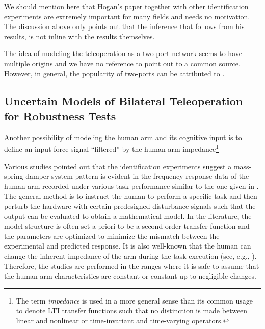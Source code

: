 We should mention here that Hogan's paper together with other identification experiments are extremely important for many
fields and needs no motivation. The discussion above only points out that the inference that follows from his results, 
is not inline with the results themselves. 

The idea of modeling the teleoperation as a two-port network seems to have multiple origins and we have no reference to 
point out to a common source. However, in general, the popularity of two-ports can be attributed to 
\cite{andersonspong,nieslotine,rajuphd,hannaford89,yokokohjiyoshikawa}. 

\subsection{Uncertain Models of Bilateral Teleoperation for Robustness Tests}\label{sec:lit:uncmodel}

Another possibility of modeling the human arm and its cognitive input is to define an input force signal ``filtered'' by the 
human arm impedance\footnote{The term \emph{impedance} is used in a more general sense than its common usage to denote
LTI transfer functions such that no distinction is made between linear and nonlinear or time-invariant and time-varying 
operators.} 

Various studies pointed out that the identification experiments suggest a mass-spring-damper system pattern is evident
in the frequency response data of the human arm recorded under various task performance similar to the one given in \cite{hogan89}.
The general method is to instruct the human to perform a specific task and then perturb the hardware with certain predesigned
disturbance signals such that the output can be evaluated to obtain a mathematical model. In the literature, the model structure
is often set a priori to be a second order transfer function and the parameters are optimized to minimize the mismatch between
the experimental and predicted response. It is also well-known that the human can change the inherent impedance of the arm during
the task execution (see, e.g., \cite{tsujimorasso}). Therefore, the studies are performed in the ranges where it is safe to assume 
that the human arm characteristics are constant or constant up to negligible changes. 



